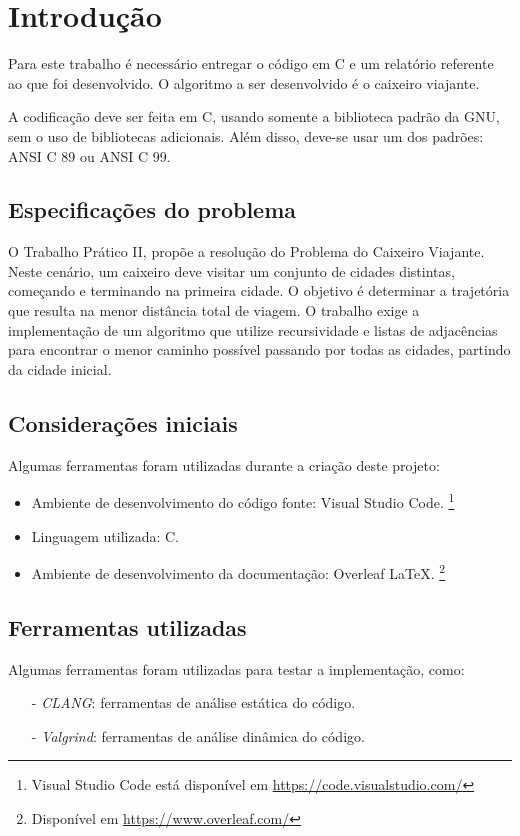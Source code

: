 \documentclass{article}
\begin{document}


\section{Introdução}


Para este trabalho é necessário entregar o código em C e um relatório referente ao que foi desenvolvido. O algoritmo a ser desenvolvido é o caixeiro viajante.

A codificação deve ser feita em C, usando somente a biblioteca padrão da GNU, sem o uso de bibliotecas adicionais. Além disso, deve-se usar um dos padrões: ANSI C 89 ou ANSI C 99.

\subsection{Especificações do problema}

O Trabalho Prático II, propõe a resolução do Problema do Caixeiro Viajante. Neste cenário, um caixeiro deve visitar um conjunto de cidades distintas, começando e terminando na primeira cidade. O objetivo é determinar a trajetória que resulta na menor distância total de viagem. O trabalho exige a implementação de um algoritmo que utilize recursividade e listas de adjacências para encontrar o menor caminho possível passando por todas as cidades, partindo da cidade inicial.

\subsection{Considerações iniciais}

Algumas ferramentas foram utilizadas durante a criação deste projeto:

\begin{itemize}
  \item Ambiente de desenvolvimento do código fonte: Visual Studio Code. \footnote{Visual Studio Code está disponível em \url{https://code.visualstudio.com/}}
  \item Linguagem utilizada: C.
  \item Ambiente de desenvolvimento da documentação: Overleaf \LaTeX. \footnote{Disponível em \url{https://www.overleaf.com/}}
\end{itemize}

\subsection{Ferramentas utilizadas}
Algumas ferramentas foram utilizadas para testar a implementação, como:
\begin{itemize}
    \item[-] \textit{CLANG}: ferramentas de análise estática do código.
    \item[-] \textit{Valgrind}: ferramentas de análise dinâmica do código.
\end{itemize}
\end{document}
